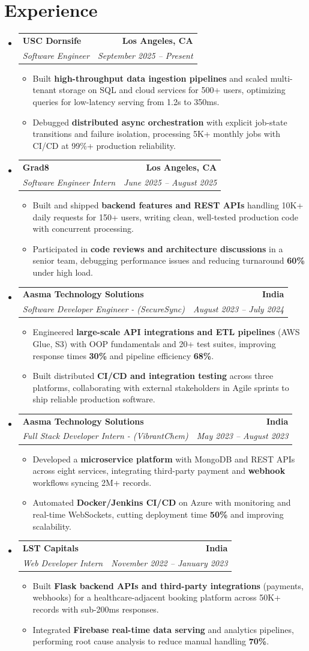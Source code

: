 \documentclass[letterpaper,10pt]{article}
\makeatletter
\newcommand{\resumeItem}[1]{\item\small{{#1 \vspace{-2pt}}}}
\newcommand{\resumeSubheading}[4]{\vspace{-1pt}\item\begin{tabular*}{1.0\textwidth}[t]{l@{\extracolsep{\fill}}r}\textbf{#1} & \textbf{\small #2} \\\textit{\small#3} & \textit{\small #4} \\\end{tabular*}\vspace{-2pt}}
\newcommand{\resumeSubHeadingListStart}{\begin{itemize}[leftmargin=0.0in, label={}]}
\newcommand{\resumeSubHeadingListEnd}{\end{itemize}}
\newcommand{\resumeItemListStart}{\begin{itemize}[leftmargin=0.15in,label=\textbullet,itemsep=2pt,topsep=0pt,parsep=0pt,partopsep=0pt]}
\newcommand{\resumeItemListEnd}{\end{itemize}\vspace{-4pt}}
\makeatother
\begin{document}
\section{Experience}
\resumeSubHeadingListStart
\resumeSubheading{USC Dornsife}{Los Angeles, CA}{Software Engineer}{September 2025 -- Present}
\resumeItemListStart
\resumeItem{Built \textbf{high-throughput data ingestion pipelines} and scaled multi-tenant storage on SQL and cloud services for 500+ users, optimizing queries for low-latency serving from 1.2s to 350ms.}
\resumeItem{Debugged \textbf{distributed async orchestration} with explicit job-state transitions and failure isolation, processing 5K+ monthly jobs with CI/CD at 99\%+ production reliability.}
\resumeItemListEnd
\resumeSubheading{Grad8}{Los Angeles, CA}{Software Engineer Intern}{June 2025 -- August 2025}
\resumeItemListStart
\resumeItem{Built and shipped \textbf{backend features and REST APIs} handling 10K+ daily requests for 150+ users, writing clean, well-tested production code with concurrent processing.}
\resumeItem{Participated in \textbf{code reviews and architecture discussions} in a senior team, debugging performance issues and reducing turnaround \textbf{60\%} under high load.}
\resumeItemListEnd
\resumeSubheading{Aasma Technology Solutions}{India}{Software Developer Engineer - (SecureSync)}{August 2023 -- July 2024}
\resumeItemListStart
\resumeItem{Engineered \textbf{large-scale API integrations and ETL pipelines} (AWS Glue, S3) with OOP fundamentals and 20+ test suites, improving response times \textbf{30\%} and pipeline efficiency \textbf{68\%}.}
\resumeItem{Built distributed \textbf{CI/CD and integration testing} across three platforms, collaborating with external stakeholders in Agile sprints to ship reliable production software.}
\resumeItemListEnd
\resumeSubheading{Aasma Technology Solutions}{India}{Full Stack Developer Intern - (VibrantChem)}{May 2023 -- August 2023}
\resumeItemListStart
\resumeItem{Developed a \textbf{microservice platform} with MongoDB and REST APIs across eight services, integrating third-party payment and \textbf{webhook} workflows syncing 2M+ records.}
\resumeItem{Automated \textbf{Docker/Jenkins CI/CD} on Azure with monitoring and real-time WebSockets, cutting deployment time \textbf{50\%} and improving scalability.}
\resumeItemListEnd
\resumeSubheading{LST Capitals}{India}{Web Developer Intern}{November 2022 -- January 2023}
\resumeItemListStart
\resumeItem{Built \textbf{Flask backend APIs and third-party integrations} (payments, webhooks) for a healthcare-adjacent booking platform across 50K+ records with sub-200ms responses.}
\resumeItem{Integrated \textbf{Firebase real-time data serving} and analytics pipelines, performing root cause analysis to reduce manual handling \textbf{70\%}.}
\resumeItemListEnd
\resumeSubHeadingListEnd
\vspace{-6pt}
\end{document}
